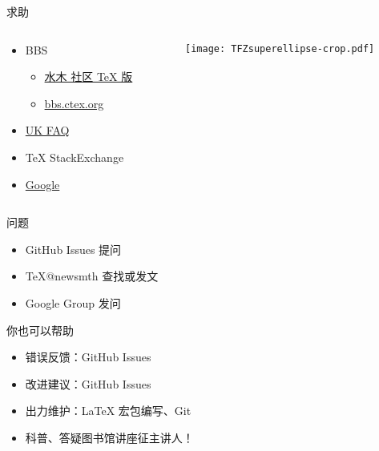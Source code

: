 \begin{frame}{求助}
  \begin{columns}[c]
    \begin{column}{.45\textwidth}
      \begin{itemize}
        \item BBS
          \begin{itemize}
            \item \href{http://www.newsmth.net/nForum/board/TeX}{水木
              社区 TeX 版}
            \item \href{http://bbs.ctex.org/}{bbs.ctex.org}
          \end{itemize}
        \item \href{http://www.tex.ac.uk/cgi-bin/texfaq2html}{UK FAQ}
        \item TeX StackExchange
        \item \href{http://justfuckinggoogleit.com/}{Google}
      \end{itemize}
    \end{column}
    \begin{column}{.45\textwidth}
      \texttt{[image: TFZsuperellipse-crop.pdf]}
    \end{column}
  \end{columns}
\end{frame}

\begin{frame}{\ThuThesis 问题}
\begin{itemize}
\item GitHub Issues 提问
\item \TeX @newsmth 查找或发文
\item \href{http://groups.google.com/group/thuthesis}\ThuThesis{} Google Group 发问
\end{itemize}
\end{frame}


\begin{frame}{你也可以帮助}
\begin{itemize}
\item 错误反馈：GitHub Issues
\item 改进建议：GitHub Issues
\item 出力维护：LaTeX 宏包编写、Git
\item 科普、答疑\pause \hspace{2em}\alert{图书馆讲座征主讲人！}
\end{itemize}
\end{frame}

